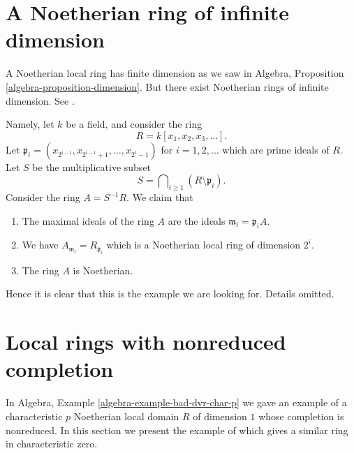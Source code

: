 \section{A Noetherian ring of infinite dimension}
\label{section-Noetherian-infinite-dimension}

\noindent
A Noetherian local ring has finite dimension as we saw in
Algebra, Proposition \ref{algebra-proposition-dimension}.
But there exist Noetherian rings of infinite dimension.
See \cite[Appendix, Example 1]{Nagata}.

\medskip\noindent
Namely, let $k$ be a field, and consider the ring
$$
R = k[x_1, x_2, x_3, \ldots ].
$$
Let $\mathfrak p_i = (x_{2^{i - 1}}, x_{2^{i - 1} + 1}, \ldots, x_{2^i - 1})$
for $i = 1, 2, \ldots$ which are prime ideals of $R$. Let $S$
be the multiplicative subset
$$
S = \bigcap\nolimits_{i \geq 1} (R \setminus \mathfrak p_i).
$$
Consider the ring $A = S^{-1}R$.
We claim that
\begin{enumerate}
\item The maximal ideals of the ring $A$ are the ideals
$\mathfrak m_i = \mathfrak p_iA$.
\item We have $A_{\mathfrak m_i} = R_{\mathfrak p_i}$ which is
a Noetherian local ring of dimension $2^i$.
\item The ring $A$ is Noetherian.
\end{enumerate}
Hence it is clear that this is the example we are looking for.
Details omitted.




\section{Local rings with nonreduced completion}
\label{section-local-completion-nonreduced}

\noindent
In Algebra, Example \ref{algebra-example-bad-dvr-char-p} we gave an example
of a characteristic $p$ Noetherian local domain $R$ of dimension $1$
whose completion is nonreduced. In this section we present the example
of \cite[Proposition 3.1]{Ferrand-Raynaud} which gives a similar
ring in characteristic zero.

